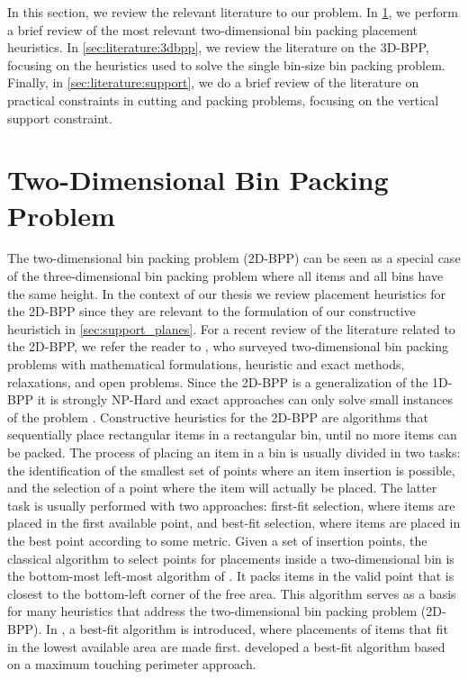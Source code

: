 In this section, we review the relevant literature to our problem. 
In \cref{sec:literature:2dbpp}, we perform a brief review of the most relevant two-dimensional bin packing placement heuristics.
In \cref{sec:literature:3dbpp}, we review the literature on the 3D-BPP, focusing on the heuristics used to solve the single bin-size bin packing problem.
Finally, in \cref{sec:literature:support}, we do a brief review of the literature on practical constraints in cutting and packing problems, focusing on the vertical support constraint.

\section{Two-Dimensional Bin Packing Problem}
\label{sec:literature:2dbpp}%

The two-dimensional bin packing problem (2D-BPP) can be seen as a special case of the three-dimensional bin packing problem where all items and all bins have the same height.
In the context of our thesis we review placement heuristics for the 2D-BPP since they are relevant to the formulation of our constructive heuristich in \cref{sec:support_planes}.
For a recent review of the literature related to the 2D-BPP, we refer the reader to \cite{IORI2021399}, who surveyed two-dimensional bin packing problems with mathematical formulations, heuristic and exact methods, relaxations, and open problems.
Since the 2D-BPP is a generalization of the 1D-BPP it is strongly NP-Hard and exact approaches can only solve small instances of the problem \cite{martello2000three}.
Constructive heuristics for the 2D-BPP are algorithms that sequentially place rectangular items in a rectangular bin, until no more items can be packed.
The process of placing an item in a bin is usually divided in two tasks: the identification of the smallest set of points where an item insertion is possible, and the selection of a point where the item will actually be placed. 
The latter task is usually performed with two approaches: first-fit selection, where items are placed in the first available point, and best-fit selection, where items are placed in the best point according to some metric. 
Given a set of insertion points, the classical algorithm to select points for placements inside a two-dimensional bin is the bottom-most left-most algorithm of \cite{Baker1980}. 
It packs items in the valid point that is closest to the bottom-left corner of the free area. This algorithm serves as a basis for many heuristics that address the two-dimensional bin packing problem (2D-BPP).
In \cite{burke2004new}, a best-fit algorithm is introduced, where placements of items that fit in the lowest available area are made first.
\cite{lodi1999heuristic} developed a best-fit algorithm based on a maximum touching perimeter approach.

